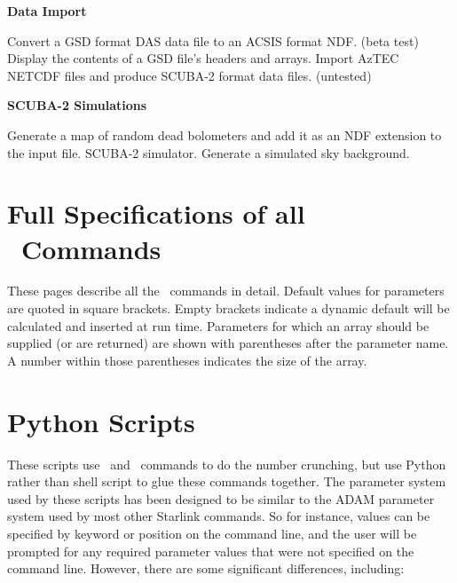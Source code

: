 \documentclass[oneside,11pt]{starlink}
\begin{document}
{\large
\begin{center}
\textbf{Data Import}
\end{center}
}

\begin{description}[itemsep=0.pt]
 Convert a GSD format DAS data file to an ACSIS format NDF. (beta test)
 Display the contents of a GSD file's headers and arrays.
 Import AzTEC NETCDF files and produce SCUBA-2 format data files. (untested)
\end{description}

{\large
\begin{center}
\textbf{SCUBA-2 Simulations}
\end{center}
}

\begin{description}[itemsep=0.pt]
 Generate a map of random dead bolometers and add it as an NDF extension to the input file.
SCUBA-2 simulator.
 Generate a simulated sky background.
\end{description}

\section{Full Specifications of all \SMURF\ Commands\label{ap:full}}

These pages describe all the \SMURF\ commands in detail. Default
values for parameters are quoted in square brackets. Empty brackets
indicate a dynamic default will be calculated and inserted at run
time. Parameters for which an array should be supplied (or are
returned) are shown with parentheses after the parameter name. A
number within those parentheses indicates the size of the array.




\clearpage

\section{Python Scripts}

These scripts use \KAPPA\ and \SMURF\ commands to do the number
crunching, but use Python rather than shell script to glue these commands
together. The parameter system used by these scripts has been designed to
be similar to the ADAM parameter system used by most other Starlink
commands. So for instance, values can be specified by keyword or position
on the command line, and the user will be prompted for any required parameter
values that were not specified on the command line. However, there are some
significant differences, including:
\end{document}
